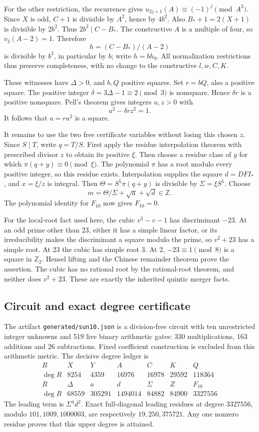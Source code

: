 For the other restriction, the recurrence gives
\(u_{2j+1}(A)\equiv(-1)^j\pmod{A^2}\). Since \(X\) is odd, \(C+1\) is
divisible by \(A^2\), hence by \(4b^2\). Also \(B_*+1=2(X+1)\) is
divisible by \(2b^2\). Thus \(2b^2\mid C-B_*\). The constructive \(A\)
is a multiple of four, so \(v_2(A-2)=1\). Therefore \[
 h=(C-B_*)/(A-2)
\] is divisible by \(b^2\), in particular by \(b\); write \(h=bh_0\).
All normalization restrictions thus preserve completeness, with no
change to the constructive \(l,w,C,K\).

These witnesses have \(\Delta>0\), and \(b,Q\) positive squares. Set
\(r=bQ\), also a positive square. The positive integer
\(\delta=3\Delta-1\equiv2\pmod3\) is nonsquare. Hence \(\delta r\) is a
positive nonsquare. Pell's theorem gives integers \(u,z>0\) with \[
 u^2-\delta r z^2=1.
\] It follows that \(a=ru^2\) is a square.

It remains to use the two free certificate variables without losing this
chosen \(z\). Since \(S\mid T\), write \(q=T/S\). First apply the
residue interpolation theorem with prescribed divisor \(z\) to obtain
its positive \(\xi\). Then choose a residue class of \(y\) for which
\(\pi(q+y)\equiv0\pmod\xi\). The polynomial \(\pi\) has a root modulo
every positive integer, so this residue exists. Interpolation supplies
the square \(d=DFI_*\), and \(x=\xi/z\) is integral. Then
\(\Theta=S^5\pi(q+y)\) is divisible by \(\Sigma=\xi S^5\). Choose \[
 m=\Theta/\Sigma+\sqrt a+\sqrt d\in\mathbb Z.
\] The polynomial identity for \(F_{10}\) now gives \(F_{10}=0\).

For the local-root fact used here, the cubic \(v^3-v-1\) has
discriminant \(-23\). At an odd prime other than 23, either it has a
simple linear factor, or its irreducibility makes the discriminant a
square modulo the prime, so \(v^2+23\) has a simple root. At 23 the
cubic has simple root 3. At 2, \(-23\equiv1\pmod8\) is a square in
\(\mathbb Z_2\). Hensel lifting and the Chinese remainder theorem prove
the assertion. The cubic has no rational root by the rational-root
theorem, and neither does \(v^2+23\). These are exactly the inherited
quintic merger facts.
\subsection{Circuit and exact degree certificate}
The artifact \texttt{generated/sun10.json} is a division-free circuit with ten unrestricted integer unknowns and 519 live binary arithmetic gates: 330 multiplications, 163 additions and 26 subtractions. Fixed coefficient construction is excluded from this arithmetic metric. The decisive degree ledger is
\[
\begin{array}{c|rrrrrr}
R&X&Y&A&C&K&Q\\\hline
\deg R&8254&4359&16976&16978&29592&118364\\
R&\Delta&a&d&\Sigma&Z&F_{10}\\\hline
\deg R&68559&305291&1494014&84882&84900&3327556
\end{array}
\]
The leading term is $\Sigma^4d^2$. Exact full-diagonal leading residues at degree $3327556$, modulo $101,1009,1000003$, are respectively $19,250,375721$. Any one nonzero residue proves that this upper degree is attained.

